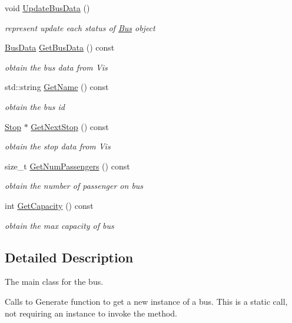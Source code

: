 \begin{DoxyCompactItemize}
void \hyperlink{classBus_a38b7ee7b13b3438894e914a6933a6f44}{Update\+Bus\+Data} ()
\begin{DoxyCompactList}\small\item\em represent update each status of \hyperlink{classBus}{Bus} object \end{DoxyCompactList}\item 
\hyperlink{structBusData}{Bus\+Data} \hyperlink{classBus_aee8d077fc426b73942dec2564b5d066a}{Get\+Bus\+Data} () const
\begin{DoxyCompactList}\small\item\em obtain the bus data from Vis \end{DoxyCompactList}\item 
std\+::string \hyperlink{classBus_a2143b0563ad48b1b67e114d1ba5342ca}{Get\+Name} () const
\begin{DoxyCompactList}\small\item\em obtain the bus id \end{DoxyCompactList}\item 
\hyperlink{classStop}{Stop} $\ast$ \hyperlink{classBus_a6068e9801c6da152f05e40eb26e80b02}{Get\+Next\+Stop} () const
\begin{DoxyCompactList}\small\item\em obtain the stop data from Vis \end{DoxyCompactList}\item 
size\+\_\+t \hyperlink{classBus_a346aaa56030d4707886e1db8181e8b55}{Get\+Num\+Passengers} () const
\begin{DoxyCompactList}\small\item\em obtain the number of passenger on bus \end{DoxyCompactList}\item 
int \hyperlink{classBus_a3a1f68e9e2548f981d0150901918922c}{Get\+Capacity} () const
\begin{DoxyCompactList}\small\item\em obtain the max capacity of bus \end{DoxyCompactList}\end{DoxyCompactItemize}


\subsection{Detailed Description}
The main class for the bus. 

Calls to Generate function to get a new instance of a bus. This is a static call, not requiring an instance to invoke the method. 

